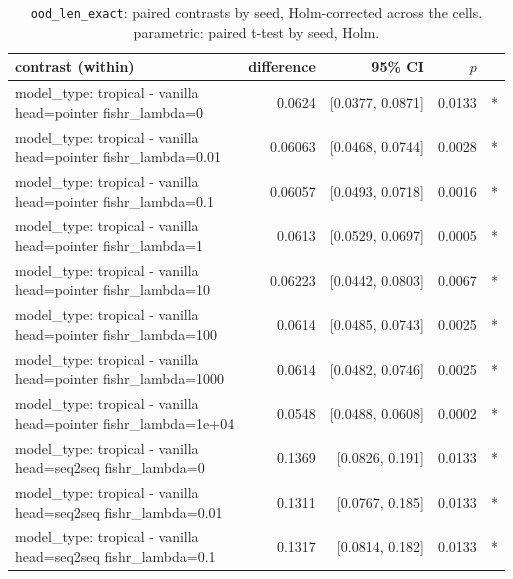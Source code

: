 \documentclass[10pt]{article}
\makeatletter
\newcommand{\stackcell}[1]{\begin{tabular}[t]{@{}l@{}}#1\end{tabular}}
\makeatother
\begin{document}
{\small
\begin{longtable}{lrrrl}
\caption{\texttt{ood\_len\_exact}: paired contrasts by seed, Holm-corrected across the cells. parametric: paired t-test by seed, Holm.}\label{tab:paired-ood_len_exact}\\
\toprule
contrast (within) & difference & 95\% CI & $p$ & \\
\midrule
\endhead
\stackcell{model\_type: tropical - vanilla\\\footnotesize head=pointer fishr\_lambda=0 } & 0.0624 & [0.0377, 0.0871] & 0.0133 & *\\
\stackcell{model\_type: tropical - vanilla\\\footnotesize head=pointer fishr\_lambda=0.01 } & 0.06063 & [0.0468, 0.0744] & 0.0028 & *\\
\stackcell{model\_type: tropical - vanilla\\\footnotesize head=pointer fishr\_lambda=0.1 } & 0.06057 & [0.0493, 0.0718] & 0.0016 & *\\
\stackcell{model\_type: tropical - vanilla\\\footnotesize head=pointer fishr\_lambda=1 } & 0.0613 & [0.0529, 0.0697] & 0.0005 & *\\
\stackcell{model\_type: tropical - vanilla\\\footnotesize head=pointer fishr\_lambda=10 } & 0.06223 & [0.0442, 0.0803] & 0.0067 & *\\
\stackcell{model\_type: tropical - vanilla\\\footnotesize head=pointer fishr\_lambda=100 } & 0.0614 & [0.0485, 0.0743] & 0.0025 & *\\
\stackcell{model\_type: tropical - vanilla\\\footnotesize head=pointer fishr\_lambda=1000 } & 0.0614 & [0.0482, 0.0746] & 0.0025 & *\\
\stackcell{model\_type: tropical - vanilla\\\footnotesize head=pointer fishr\_lambda=1e+04 } & 0.0548 & [0.0488, 0.0608] & 0.0002 & *\\
\stackcell{model\_type: tropical - vanilla\\\footnotesize head=seq2seq fishr\_lambda=0 } & 0.1369 & [0.0826, 0.191] & 0.0133 & *\\
\stackcell{model\_type: tropical - vanilla\\\footnotesize head=seq2seq fishr\_lambda=0.01 } & 0.1311 & [0.0767, 0.185] & 0.0133 & *\\
\stackcell{model\_type: tropical - vanilla\\\footnotesize head=seq2seq fishr\_lambda=0.1 } & 0.1317 & [0.0814, 0.182] & 0.0133 & *\\

\end{longtable}}
\end{document}

